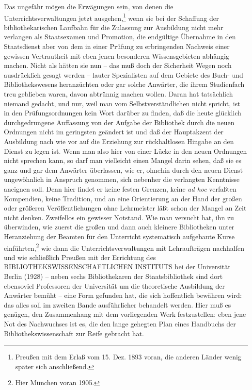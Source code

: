 \documentclass[a4paper,
fontsize=11pt,
oneside,
numbers=noperiodatend,
parskip=half-,
bibliography=totoc,
final
]{scrartcl}
\begin{document}
Das ungefähr mögen die Erwägungen sein, von denen die
Unterrichtsverwaltungen jetzt ausgehen,\footnote{Preußen mit dem Erlaß
  vom 15. Dez. 1893 voran, die anderen Länder wenig später sich
  anschließend.} wenn sie bei der Schaffung der bibliothekarischen
Laufbahn für die Zulassung zur Ausbildung nicht mehr verlangen als
Staatsexamen und Promotion, die endgültige Übernahme in den Staatsdienst
aber von dem in einer Prüfung zu erbringenden Nachweis einer gewissen
Vertrautheit mit eben jenen besonderen Wissensgebieten abhängig machen.
Nicht als hätten sie nun -- das muß doch der Sicherheit Wegen noch
ausdrücklich gesagt werden -- lauter Spezialisten auf dem Gebiete des
Buch- und Bibliothekswesens heranzüchten oder gar solche Anwärter, die
ihrem Studienfach treu geblieben waren, davon abtrünnig machen wollen.
Daran hat tatsächlich niemand gedacht, und nur, weil man vom
Selbstverständlichen nicht spricht, ist in den Prüfungsordnungen kein
Wort darüber zu finden, daß die heute glücklich durchgedrungene
Auffassung von der Aufgabe der Bibliothek durch die neuen Ordnungen
nicht im geringsten geändert ist und daß der Hauptakzent der Ausbildung
nach wie vor auf die Erziehung zur rückhaltlosen Hingabe an den Dienst
zu legen ist. Wenn man also hier von einer Lücke in den neuen Ordnungen
nicht sprechen kann, so darf man vielleicht einen Mangel darin sehen,
daß sie es ganz und gar dem Anwärter überlassen, wie er, ohnehin durch
den neuen Dienst ungewöhnlich in Anspruch genommen, sich nebenher die
verlangten Kenntnisse aneignen soll. Denn hier findet er keine festen
Grenzen, keine \emph{ad hoc} verfaßten Kompendien, keine Tradition, und
an eine Orientierung an der Hand der großen oder größeren
Veröffentlichungen ohne Lehrmeister läßt schon der Mangel an Zeit nicht
denken. Zweifellos ein gewisser Notstand. Wie man versucht hat, ihn zu
überwinden, wie zuerst die großen und dann auch kleinere Bibliotheken
unter Heranziehung der Beamten für den Unterricht systematisch
aufgebaute Kurse einführten,\footnote{Hier München voran 1905.} wie dann
die Unterrichtsverwaltungen mit Lehraufträgen nachhalfen und wie
schließlich Preußen mit der Errichtung des BIBLIOTHEKSWISSENSCHAFTLICHEN
INSTITUTS bei der Universität Berlin (1928) -- neben sechs
Bibliothekaren der Staatsbibliothek sind dort ebensoviel Professoren der
Universität um die theoretische Ausbildung der Anwärter bemüht -- eine
Form gefunden hat, die sich hoffentlich bewähren wird: das alles soll im
zweiten Bande ausführlicher behandelt werden. Hier muß es genügen, den
Zusammenhang mit dem vorliegenden Werk festzustellen: eben jene Not des
Nachwuchses ist es, die den lange gehegten Plan eines Handbuchs der
Bibliothekswissenschaft zur Reife gebracht hat.
\end{document}
